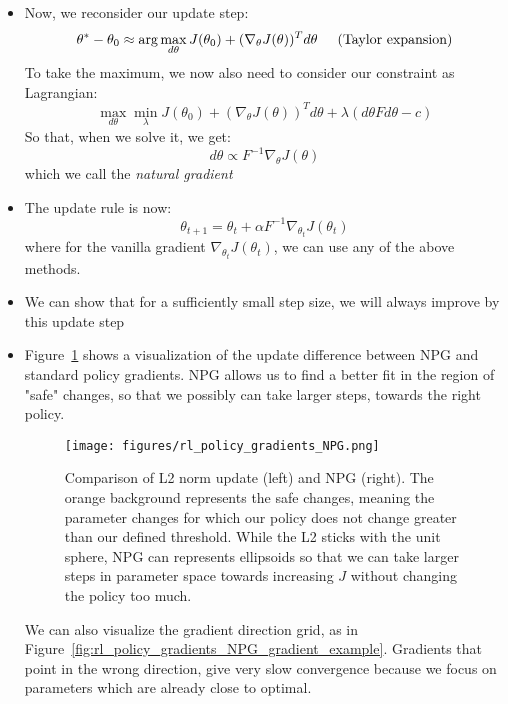 \begin{itemize}
	\item Now, we reconsider our update step:
	\begin{equation*}
		\begin{split}
			\theta^{*}-\theta_0 & \approx \arg\max_{d\theta} J(\theta_0) + (\nabla_{\theta} J(\theta))^T d\theta \hspace{5mm}\text{(Taylor expansion)}\\
		\end{split}
	\end{equation*}
	To take the maximum, we now also need to consider our constraint as Lagrangian:
	$$\max_{d\theta}\min_{\lambda} J(\theta_0) + (\nabla_{\theta} J(\theta))^T d\theta + \lambda (d\theta F d\theta-c)$$
	So that, when we solve it, we get:
	$$d\theta  \propto F^{-1}\nabla_{\theta}J(\theta)$$
	which we call the \textit{natural gradient}
	\item The update rule is now:
	$$\theta_{t+1} = \theta_t + \alpha F^{-1}\nabla_{\theta_t}J(\theta_t)$$
	where for the vanilla gradient $\nabla_{\theta_t}J(\theta_t)$, we can use any of the above methods.
	\item We can show that for a sufficiently small step size, we will always improve by this update step 
	\item Figure~\ref{fig:rl_policy_gradients_NPG} shows a visualization of the update difference between NPG and standard policy gradients. NPG allows us to find a better fit in the region of "safe" changes, so that we possibly can take larger steps, towards the right policy.
	
	\begin{figure}[ht!]
		\centering
		\texttt{[image: figures/rl\_policy\_gradients\_NPG.png]}
		\caption{Comparison of L2 norm update (left) and NPG (right). The orange background represents the safe changes, meaning the parameter changes for which our policy does not change greater than our defined threshold. While the L2 sticks with the unit sphere, NPG can represents ellipsoids so that we can take larger steps in parameter space towards increasing $J$ without changing the policy too much.}
		\label{fig:rl_policy_gradients_NPG}
	\end{figure}

	We can also visualize the gradient direction grid, as in Figure~\ref{fig:rl_policy_gradients_NPG_gradient_example}. Gradients that point in the wrong direction, give very slow convergence because we focus on parameters which are already close to optimal. 
	

\end{itemize}
